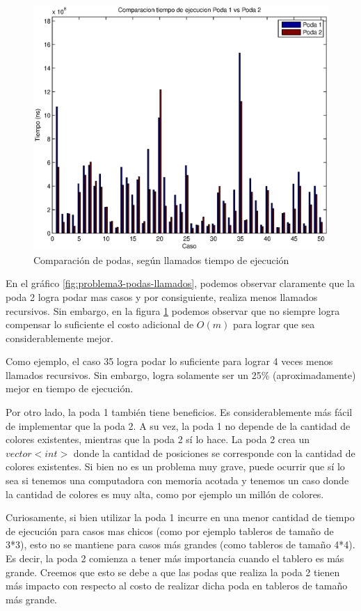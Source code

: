 \begin{center}
  \begin{figure}[H]
\includegraphics[width=\linewidth]{problema3/graficos/comparacion_podas1y2_tiempo.eps}
    \caption{Comparación de podas, según llamados tiempo de ejecución}
    \label{fig:problema3-podas-tiempo}
  \end{figure}
\end{center}


En el gráfico \ref{fig:problema3-podas-llamados}, podemos observar claramente que la poda 2 logra podar mas casos y por consiguiente, realiza menos llamados recursivos. Sin embargo, en la figura \ref{fig:problema3-podas-tiempo} podemos observar que no siempre logra compensar lo suficiente el costo adicional de $O(m)$ para lograr que sea considerablemente mejor.

Como ejemplo, el caso 35 logra podar lo suficiente para lograr 4 veces menos llamados recursivos. Sin embargo, logra solamente ser un 25\% (aproximadamente) mejor en tiempo de ejecución.

Por otro lado, la poda 1 también tiene beneficios. Es considerablemente más fácil de implementar que la poda 2. A su vez, la poda 1 no depende de la cantidad de colores existentes, mientras que la poda 2 sí lo hace. La poda 2 crea un $vector<int>$ donde la cantidad de posiciones se corresponde con la cantidad de colores existentes. Si bien no es un problema muy grave, puede ocurrir que sí lo sea si tenemos una computadora con memoria acotada y tenemos un caso donde la cantidad de colores es muy alta, como por ejemplo un millón de colores.

Curiosamente, si bien utilizar la poda 1 incurre en una menor cantidad de tiempo de ejecución para casos mas chicos (como por ejemplo tableros de tamaño de 3*3), esto no se mantiene para casos más grandes (como tableros de tamaño 4*4). Es decir, la poda 2 comienza a tener más importancia cuando el tablero es más grande. Creemos que esto se debe a que las podas que realiza la poda 2 tienen más impacto con respecto al costo de realizar dicha poda en tableros de tamaño más grande.